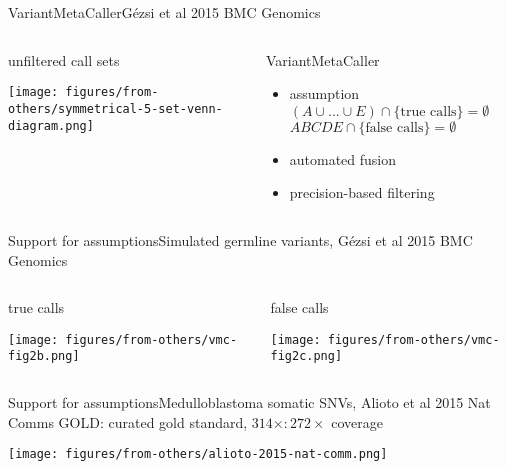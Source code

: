 \documentclass{beamer}
\begin{document}
\begin{frame}{VariantMetaCaller}{G\'ezsi et al 2015 BMC Genomics}

\begin{columns}[t]
\begin{column}{0.5\textwidth}{unfiltered call sets}

\texttt{[image: figures/from-others/symmetrical-5-set-venn-diagram.png]}
\end{column}

\begin{column}{0.5\textwidth}{VariantMetaCaller}
\small
\begin{itemize}
\item<1-> assumption 
\((A\cup ...\cup E) \cap \{\text{true calls\}} = \emptyset\)
\(ABCDE \cap \{\text{false calls\}} = \emptyset\)
\item<1-> automated fusion%
\item<1-> precision-based filtering 
\end{itemize}
\end{column}
\end{columns}
\end{frame}

\begin{frame}{Support for assumptions}{Simulated germline
variants, G\'ezsi et al 2015 BMC Genomics}
\begin{columns}[t]
\begin{column}{0.5\textwidth}{true calls}

\texttt{[image: figures/from-others/vmc-fig2b.png]}
\end{column}

\begin{column}{0.5\textwidth}{false calls}

\texttt{[image: figures/from-others/vmc-fig2c.png]}
\end{column}
\end{columns}
\end{frame}

\begin{frame}{Support for assumptions}{Medulloblastoma
somatic SNVs, Alioto et al 2015 Nat Comms}{}
GOLD: curated gold standard, \(314\times
: 272\times\)
coverage

\texttt{[image: figures/from-others/alioto-2015-nat-comm.png]}
\end{frame}
\end{document}
